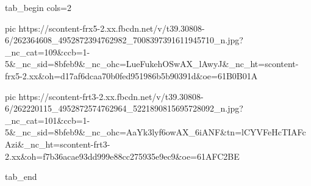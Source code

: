  
 
 
 
 


\ifcmt
  tab_begin cols=2

     pic https://scontent-frx5-2.xx.fbcdn.net/v/t39.30808-6/262364608_4952872394762982_7008397391611945710_n.jpg?_nc_cat=109&ccb=1-5&_nc_sid=8bfeb9&_nc_ohc=LueFukehOSwAX_lAwyJ&_nc_ht=scontent-frx5-2.xx&oh=d17af6dcaa70b0fed951986b5b90391d&oe=61B0B01A

     pic https://scontent-frt3-2.xx.fbcdn.net/v/t39.30808-6/262220115_4952872574762964_5221890815695728092_n.jpg?_nc_cat=101&ccb=1-5&_nc_sid=8bfeb9&_nc_ohc=AaYk3lyf6owAX_6iANF&tn=lCYVFeHcTIAFcAzi&_nc_ht=scontent-frt3-2.xx&oh=f7b36acae93dd999e88cc275935e9ec9&oe=61AFC2BE

  tab_end
\fi
